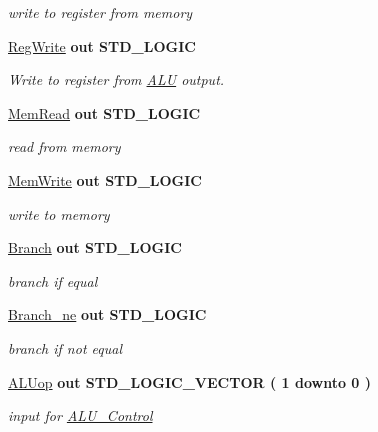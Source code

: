\begin{DoxyCompactItemize}
\begin{DoxyCompactList}\small\item\em write to register from memory \end{DoxyCompactList}\item 
\hyperlink{class_control_a3862189e11b01293ae0279072adc6151}{\-Reg\-Write}  {\bfseries {\bfseries out }} {\bfseries \-S\-T\-D\-\_\-\-L\-O\-G\-I\-C } 
\begin{DoxyCompactList}\small\item\em \-Write to register from \hyperlink{class_a_l_u}{\-A\-L\-U} output. \end{DoxyCompactList}\item 
\hyperlink{class_control_a703e49c8be2a086810119a4f32c2edd0}{\-Mem\-Read}  {\bfseries {\bfseries out }} {\bfseries \-S\-T\-D\-\_\-\-L\-O\-G\-I\-C } 
\begin{DoxyCompactList}\small\item\em read from memory \end{DoxyCompactList}\item 
\hyperlink{class_control_af268f4bd077313d14130fa77402beccb}{\-Mem\-Write}  {\bfseries {\bfseries out }} {\bfseries \-S\-T\-D\-\_\-\-L\-O\-G\-I\-C } 
\begin{DoxyCompactList}\small\item\em write to memory \end{DoxyCompactList}\item 
\hyperlink{class_control_a8bcff3a33808999c1998531a90201ac6}{\-Branch}  {\bfseries {\bfseries out }} {\bfseries \-S\-T\-D\-\_\-\-L\-O\-G\-I\-C } 
\begin{DoxyCompactList}\small\item\em branch if equal \end{DoxyCompactList}\item 
\hyperlink{class_control_a24dd763afcb5d8a8d91e3c3f5a415704}{\-Branch\-\_\-ne}  {\bfseries {\bfseries out }} {\bfseries \-S\-T\-D\-\_\-\-L\-O\-G\-I\-C } 
\begin{DoxyCompactList}\small\item\em branch if not equal \end{DoxyCompactList}\item 
\hyperlink{class_control_accc0d3f810d226b65ebd44774daada7e}{\-A\-L\-Uop}  {\bfseries {\bfseries out }} {\bfseries \-S\-T\-D\-\_\-\-L\-O\-G\-I\-C\-\_\-\-V\-E\-C\-T\-O\-R (   1    downto    0  ) } 
\begin{DoxyCompactList}\small\item\em input for \hyperlink{class_a_l_u___control}{\-A\-L\-U\-\_\-\-Control} \end{DoxyCompactList}\end{DoxyCompactItemize}


